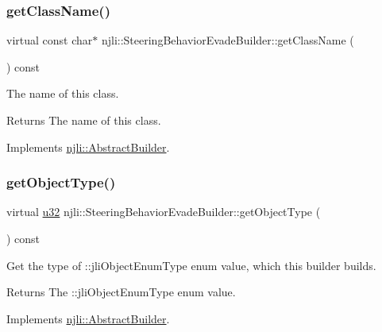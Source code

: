 \subsubsection{\texorpdfstring{get\+Class\+Name()}{getClassName()}}
{\footnotesize\ttfamily virtual const char$\ast$ njli\+::\+Steering\+Behavior\+Evade\+Builder\+::get\+Class\+Name (\begin{DoxyParamCaption}{ }\end{DoxyParamCaption}) const\hspace{0.3cm}{\ttfamily [virtual]}}

The name of this class.

\begin{DoxyReturn}{Returns}
The name of this class. 
\end{DoxyReturn}


Implements \mbox{\hyperlink{classnjli_1_1_abstract_builder_a902f73ea78031b06aca183a417f3413b}{njli\+::\+Abstract\+Builder}}.

\mbox{\label{classnjli_1_1_steering_behavior_evade_builder_a38506bbad92150c615a3fbec153b1410}} 
\subsubsection{\texorpdfstring{get\+Object\+Type()}{getObjectType()}}
{\footnotesize\ttfamily virtual \mbox{\hyperlink{_util_8h_a10e94b422ef0c20dcdec20d31a1f5049}{u32}} njli\+::\+Steering\+Behavior\+Evade\+Builder\+::get\+Object\+Type (\begin{DoxyParamCaption}{ }\end{DoxyParamCaption}) const\hspace{0.3cm}{\ttfamily [virtual]}}

Get the type of \+::jli\+Object\+Enum\+Type enum value, which this builder builds.

\begin{DoxyReturn}{Returns}
The \+::jli\+Object\+Enum\+Type enum value. 
\end{DoxyReturn}


Implements \mbox{\hyperlink{classnjli_1_1_abstract_builder_a0f2d344fcf697b167f4f2b1122b5fb33}{njli\+::\+Abstract\+Builder}}.

